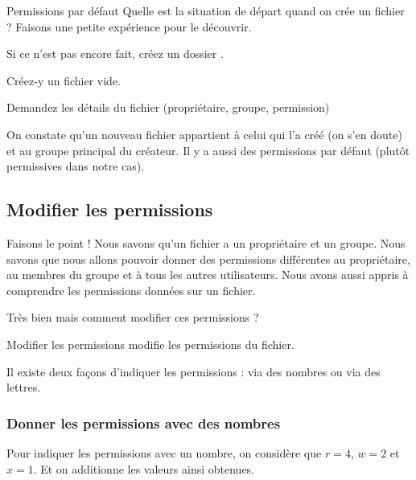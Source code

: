 \documentclass[a4paper,11pt]{style-esi/td}
\begin{document}
		\begin{Experience}{Permissions par défaut}
			Quelle est la situation de départ quand on crée un fichier ?
			Faisons une petite expérience pour le découvrir.
			\begin{steps}
			\item Si ce n'est pas encore fait, créez un dossier .
			\item Créez-y un fichier vide.
			\item Demandez les détails du fichier (propriétaire, groupe, permission)
			\end{steps}
			On constate qu'un nouveau fichier appartient à celui qui l'a créé 
			(on s'en doute) et au groupe principal du créateur. 
			Il y a aussi des permissions par défaut (plutôt permissives dans notre cas).  
		\end{Experience}		
	
	\subsection{Modifier les permissions}

		\begin{infotbox}{Faisons le point !}
			Nous savons qu'un fichier a un propriétaire et un groupe.
			Nous savons que nous allons pouvoir donner des permissions
			différentes au propriétaire, au membres du groupe 
			et à tous les autres utilisateurs.
			Nous avons aussi appris à comprendre les permissions données sur un fichier.
		\end{infotbox}
	
		Très bien mais comment modifier ces permissions ?

		\begin{theorie}{Modifier les permissions}
			 modifie les permissions du fichier.
		\end{theorie}

		Il existe deux façons d'indiquer les permissions : via des nombres ou via des lettres.

		\subsubsection{Donner les permissions avec des nombres}

			Pour indiquer les permissions avec un nombre, 
			on considère que $r=4$, $w=2$ et $x=1$. 
			Et on additionne les valeurs ainsi obtenues.
\end{document}
